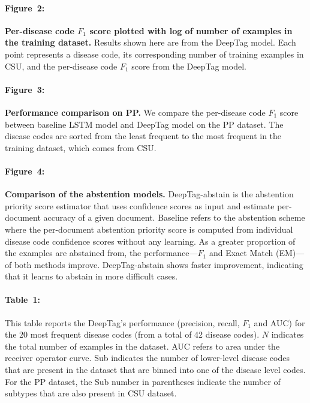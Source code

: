 \documentclass{article}[11pt,oneside]
\begin{document}
\paragraph{Figure~2:} {\bf Per-disease code $F_1$ score plotted with log of number of examples in the training dataset.} Results shown here are from the DeepTag model. Each point represents a disease code, its corresponding number of training examples in CSU, and the per-disease code $F_1$ score from the DeepTag model.

\paragraph{Figure~3:} {\bf Performance comparison on PP.} 
We compare the per-disease code $F_1$ score between baseline LSTM model and DeepTag model on the PP dataset. The disease codes are sorted from the least frequent to the most frequent in the training dataset, which comes from CSU.

\paragraph{Figure~4:} \textbf{Comparison of the abstention models. } DeepTag-abstain is the abstention priority score estimator that uses confidence scores as input and estimate per-document accuracy of a given document. Baseline refers to the abstention scheme where the per-document abstention priority score is computed from individual disease code confidence scores without any learning. As a greater proportion of the examples are abstained from, the performance---$F_1$ and Exact Match (EM)---of both methods improve. DeepTag-abstain shows faster improvement, indicating that it learns to abstain in more difficult cases.

\paragraph{Table~1:} This table reports the DeepTag's performance (precision, recall, $F_1$ and AUC) for the 20 most frequent disease codes (from a total of 42 disease codes). $N$ indicates the total number of examples in the dataset. AUC refers to area under the receiver operator curve. Sub indicates the number of lower-level disease codes that are present in the dataset that are binned into one of the disease level codes. For the PP dataset, the Sub number in parentheses indicate the number of subtypes that are also present in CSU dataset. 
\end{document}
